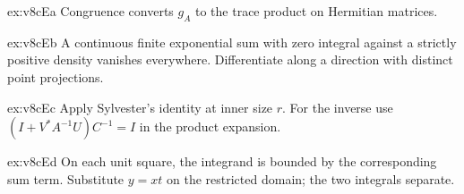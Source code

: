 \begin{hint}{ex:v8cEa}
Congruence converts $g_A$ to the trace product on Hermitian matrices.
\end{hint}
\begin{hint}{ex:v8cEb}
A continuous finite exponential sum with zero integral against a strictly positive density vanishes everywhere. Differentiate along a direction with distinct point projections.
\end{hint}
\begin{hint}{ex:v8cEc}
Apply Sylvester's identity at inner size $r$. For the inverse use $(I+V^*A^{-1}U)C^{-1}=I$ in the product expansion.
\end{hint}
\begin{hint}{ex:v8cEd}
On each unit square, the integrand is bounded by the corresponding sum term. Substitute $y=xt$ on the restricted domain; the two integrals separate.
\end{hint}

